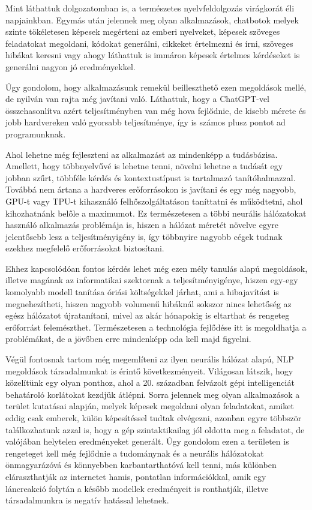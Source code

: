 
Mint láthattuk dolgozatomban is, a természetes nyelvfeldolgozás virágkorát éli napjainkban. Egymás után jelennek meg olyan alkalmazások, chatbotok melyek szinte tökéletesen képesek megérteni az emberi nyelveket, képesek szöveges feladatokat megoldani, kódokat generálni, cikkeket értelmezni és írni, szöveges hibákat keresni vagy ahogy láthattuk is immáron képesek értelmes kérdéseket is generálni nagyon jó eredményekkel. 

Úgy gondolom, hogy alkalmazásunk remekül beilleszthető ezen megoldások mellé, de nyilván van rajta még javítani való. Láthattuk, hogy a ChatGPT-vel összehasonlítva azért teljesítményben van még hova fejlődnie, de kisebb mérete és jobb hardvereken való gyorsabb teljesítménye, így is számos plusz pontot ad programunknak.

Ahol lehetne még fejleszteni az alkalmazást az mindenképp a tudásbázisa. Amellett, hogy többnyelvűvé is lehetne tenni, növelni lehetne a tudását egy jobban szűrt, többféle kérdés és kontextustípust is tartalmazó tanítóhalmazzal. Továbbá nem ártana a hardveres erőforrásokon is javítani és egy még nagyobb, GPU-t vagy TPU-t kihasználó felhőszolgáltatáson taníttatni és működtetni, ahol kihozhatnánk belőle a maximumot. Ez természetesen a többi neurális hálózatokat használó alkalmazás problémája is, hiszen a hálózat méretét növelve egyre jelentősebb lesz a teljesítményigény is, így többnyire nagyobb cégek tudnak ezekhez megfelelő erőforrásokat biztosítani.

Ehhez kapcsolódóan fontos kérdés lehet még ezen mély tanulás alapú megoldások, illetve magának az informatikai szektornak a teljesítményigénye, hiszen egy-egy komolyabb modell tanítása óriási költségekkel járhat, ami a hibajavítást is megnehezítheti, hiszen nagyobb volumenű hibáknál sokszor nincs lehetőség az egész hálózatot újratanítani, mivel az akár hónapokig is eltarthat és rengeteg erőforrást felemészthet. Természetesen a technológia fejlődése itt is megoldhatja a problémákat, de a jövőben erre mindenképp oda kell majd figyelni.

Végül fontosnak tartom még megemlíteni az ilyen neurális hálózat alapú, NLP megoldások társadalmunkat is érintő következményeit. Világosan látszik, hogy közelítünk egy olyan ponthoz, ahol a 20. században felvázolt gépi intelligenciát behatároló korlátokat kezdjük átlépni. Sorra jelennek meg olyan alkalmazások a terület kutatásai alapján, melyek képesek megoldani olyan feladatokat, amiket eddig csak emberek, külön képesítéssel tudtak elvégezni, azonban egyre többször találkozhatunk azzal is, hogy a gép szintaktikailag jól oldotta meg a feladatot, de valójában helytelen eredményeket generált. Úgy gondolom ezen a területen is rengeteget kell még fejlődnie a tudománynak és a neurális hálózatokat önmagyarázóvá és könnyebben karbantarthatóvá kell tenni, más különben eláraszthatják az internetet hamis, pontatlan információkkal, amik egy láncreakció folytán a később modellek eredményeit is ronthatják, illetve társadalmunkra is negatív hatással lehetnek.

